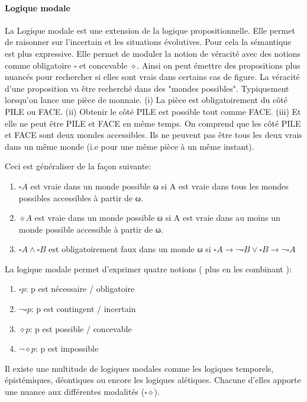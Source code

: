 \begin{refsegment}
    \paragraph{Logique modale}
    La Logique modale est une extension de la logique propositionnelle. Elle permet de raisonner sur l'incertain et les situations évolutives. Pour cela la sémantique est plus expressive. Elle permet de moduler la notion de véracité avec des notions comme obligatoire $\square$ et concevable $\diamond$. Ainsi on peut émettre des propositions plus nuancés pour rechercher si elles sont vrais dans certains cas de figure. La véracité d'une proposition va être recherché dans des "mondes possibles". Typiquement lorsqu'on lance une pièce de monnaie. (i) La pièce est obligatoirement du côté PILE ou FACE. (ii) Obtenir le côté PILE est possible tout comme FACE. (iii) Et elle ne peut être PILE et FACE en même temps. On comprend que les côté PILE et FACE sont deux mondes accessibles. Ils ne peuvent pas être tous les deux vrais dans un même monde (i.e pour une même pièce à un même instant).
    
    Ceci est généraliser de la façon suivante:\nolisttopbreak
    \begin{enumerate}[label=\roman*)]
        \item $\square A$ est vraie dans un monde possible ω si A est vraie dans tous les mondes possibles accessibles à partir de ω.
        \item $\diamond A$ est vraie dans un monde possible ω si A est vraie dans au moins un monde possible accessible à partir de ω.
        \item $\square A \land \square B$ est obligatoirement faux dans un monde ω si $\square A \to \lnot \square B \lor \square B \to \lnot\square A$
    \end{enumerate}

    La logique modale permet d'exprimer quatre notions ( plus en les combinant ):\nolisttopbreak
    \begin{enumerate}[label={}]
        \item $\square p$: p est nécessaire / obligatoire
        \item $\lnot\square p$: p est contingent / incertain
        \item $\diamond p$: p est possible / concevable
        \item $\lnot \diamond p$: p est impossible
    \end{enumerate}

    Il existe une multitude de logiques modales comme les logiques temporels, épistémiques, déontiques ou encore les logiques alétiques. Chacune d'elles apporte une nuance aux différentes modalités ($\square \diamond$).
    

\end{refsegment}
